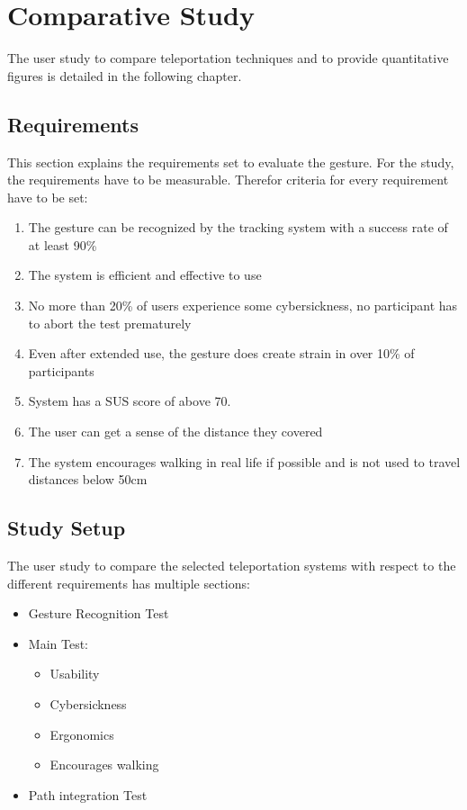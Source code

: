 \chapter{Comparative Study}
The user study to compare teleportation techniques and to provide quantitative figures is detailed in the following chapter.

\section{Requirements}
This section explains the requirements set to evaluate the gesture.
For the study, the requirements have to be measurable. Therefor criteria for every requirement have to be set:

\begin{enumerate}
    \item The gesture can be recognized by the tracking system with a success rate of at least 90\%
    \item The system is efficient and effective to use
    \item No more than 20\% of users experience some cybersickness, no participant has to abort the test prematurely
    \item Even after extended use, the gesture does create strain in over 10\% of participants
    \item System has a SUS score of above 70.
    \item The user can get a sense of the distance they covered
    \item The system encourages walking in real life if possible and is not used to travel distances below 50cm
\end{enumerate}


\section{Study Setup}
The user study to compare the selected teleportation systems with respect to the different requirements has multiple sections:
\begin{itemize}
    \item Gesture Recognition Test
    \item Main Test:
    \begin{itemize}
        \item Usability
        \item Cybersickness
        \item Ergonomics
        \item Encourages walking
    \end{itemize}
    \item Path integration Test
\end{itemize}

